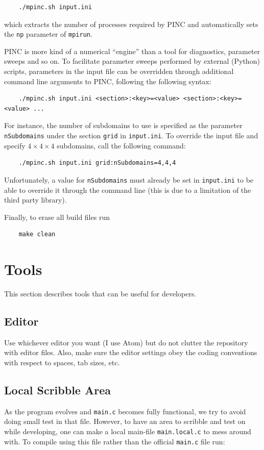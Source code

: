 \documentclass[10pt,a4paper]{article}
\begin{document}
\begin{verbatim}
	./mpinc.sh input.ini
\end{verbatim}
which extracts the number of processes required by PINC and automatically sets the \verb$np$ parameter of \verb$mpirun$.

PINC is more kind of a numerical ``engine'' than a tool for diagnostics, parameter sweeps and so on. To facilitate parameter sweeps performed by external (Python) scripts, parameters in the input file can be overridden through additional command line arguments to PINC, following the following syntax:
\begin{verbatim}
	./mpinc.sh input.ini <section>:<key>=<value> <section>:<key>=<value> ...
\end{verbatim}
For instance, the number of subdomains to use is specified as the parameter \verb$nSubdomains$ under the section \verb$grid$ in \verb$input.ini$. To override the input file and specify $4\times 4\times 4$ subdomains, call the following command:

\begin{verbatim}
	./mpinc.sh input.ini grid:nSubdomains=4,4,4
\end{verbatim}
Unfortunately, a value for \verb$nSubdomains$ must already be set in \verb$input.ini$ to be able to override it through the command line (this is due to a limitation of the third party library).

Finally, to erase all build files run
\begin{verbatim}
	make clean
\end{verbatim}

\section{Tools}
This section describes tools that can be useful for developers.

\subsection{Editor}
Use whichever editor you want (I use Atom) but do not clutter the repository with editor files. Also, make sure the editor settings obey the coding conventions with respect to spaces, tab sizes, etc.

\subsection{Local Scribble Area}
As the program evolves and \verb$main.c$ becomes fully functional, we try to avoid doing small test in that file. However, to have an area to scribble and test on while developing, one can make a local main-file \verb$main.local.c$ to mess around with. To compile using this file rather than the official \verb$main.c$ file run:
\end{document}
